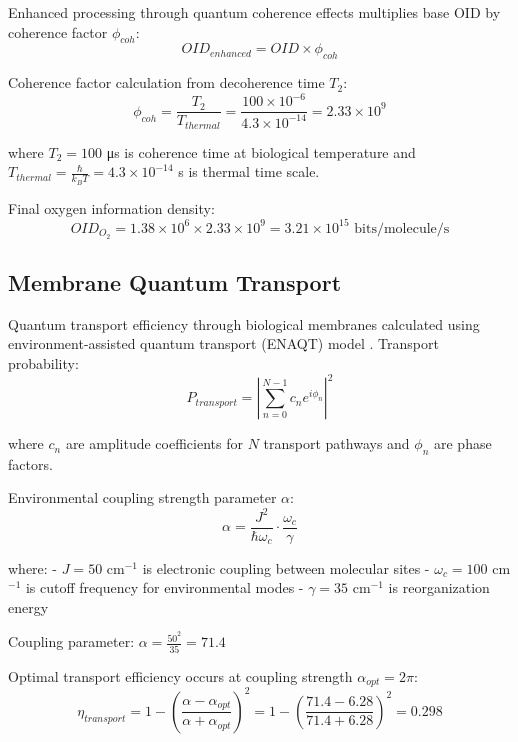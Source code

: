 Enhanced processing through quantum coherence effects multiplies base OID by coherence factor $\phi_{coh}$:
\begin{equation}
OID_{enhanced} = OID \times \phi_{coh}
\end{equation}

Coherence factor calculation from decoherence time $T_2$:
\begin{equation}
\phi_{coh} = \frac{T_2}{T_{thermal}} = \frac{100 \times 10^{-6}}{4.3 \times 10^{-14}} = 2.33 \times 10^9
\end{equation}

where $T_2 = 100$ μs is coherence time at biological temperature and $T_{thermal} = \frac{\hbar}{k_B T} = 4.3 \times 10^{-14}$ s is thermal time scale.

Final oxygen information density:
\begin{equation}
OID_{O_2} = 1.38 \times 10^6 \times 2.33 \times 10^9 = 3.21 \times 10^{15} \text{ bits/molecule/s}
\end{equation}

\subsection{Membrane Quantum Transport}

Quantum transport efficiency through biological membranes calculated using environment-assisted quantum transport (ENAQT) model \cite{mohseni2008environment}. Transport probability:
\begin{equation}
P_{transport} = \left|\sum_{n=0}^{N-1} c_n e^{i\phi_n}\right|^2
\end{equation}

where $c_n$ are amplitude coefficients for $N$ transport pathways and $\phi_n$ are phase factors.

Environmental coupling strength parameter $\alpha$:
\begin{equation}
\alpha = \frac{J^2}{\hbar \omega_c} \cdot \frac{\omega_c}{\gamma}
\end{equation}

where:
- $J = 50$ cm$^{-1}$ is electronic coupling between molecular sites
- $\omega_c = 100$ cm$^{-1}$ is cutoff frequency for environmental modes
- $\gamma = 35$ cm$^{-1}$ is reorganization energy

Coupling parameter: $\alpha = \frac{50^2}{35} = 71.4$

Optimal transport efficiency occurs at coupling strength $\alpha_{opt} = 2\pi$:
\begin{equation}
\eta_{transport} = 1 - \left(\frac{\alpha - \alpha_{opt}}{\alpha + \alpha_{opt}}\right)^2 = 1 - \left(\frac{71.4 - 6.28}{71.4 + 6.28}\right)^2 = 0.298
\end{equation}

